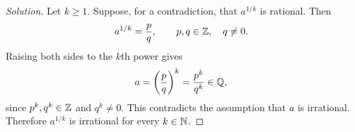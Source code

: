 
\begin{proof}[Solution]
Let $k\ge1$. Suppose, for a contradiction, that $a^{1/k}$ is
rational. Then
\[
  a^{1/k}=\frac pq,
  \qquad p,q\in\mathbb{Z},\quad q\ne0.
\]
Raising both sides to the $k$th power gives
\[
  a=\left(\frac pq\right)^k=\frac{p^k}{q^k}\in\mathbb{Q},
\]
since $p^k,q^k\in\mathbb{Z}$ and $q^k\ne0$. This contradicts the
assumption that $a$ is irrational. Therefore $a^{1/k}$ is
irrational for every $k\in\mathbb{N}$.
\end{proof}

